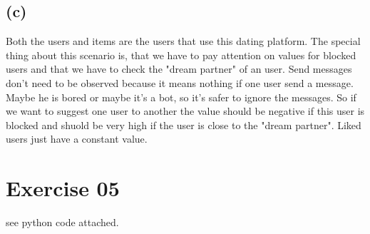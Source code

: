 \documentclass[11pt,a4paper]{scrartcl}
\begin{document}
\subsection*{(c)}

Both the users and items are the users that use this dating platform. The special thing about this scenario is, that we have to pay attention on values for blocked users and that we have to check the "dream partner" of an user. Send messages don't need to be observed because it means nothing if one user send a message. Maybe he is bored or maybe it's a bot, so it's safer to ignore the messages. So if we want to suggest one user to another the value should be negative if this user is blocked and shuold be very high if the user is close to the "dream partner". Liked users just have a constant value.

\section*{Exercise 05}
see python code attached.
\end{document}
